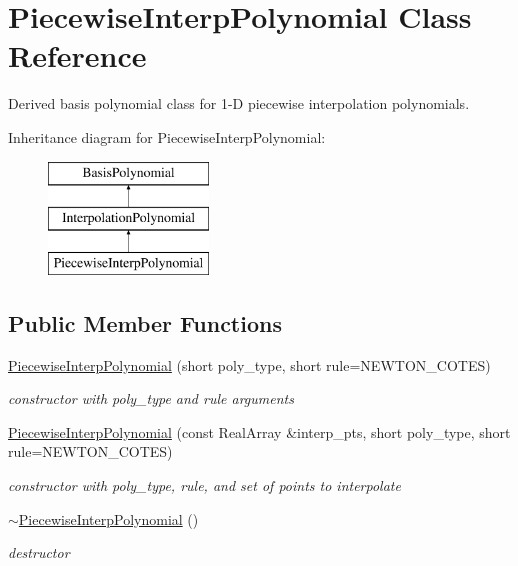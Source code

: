 \section{Piecewise\+Interp\+Polynomial Class Reference}
\label{classPecos_1_1PiecewiseInterpPolynomial}


Derived basis polynomial class for 1-\/D piecewise interpolation polynomials.  


Inheritance diagram for Piecewise\+Interp\+Polynomial\+:\begin{figure}[H]
\begin{center}
\leavevmode
\includegraphics[height=3.000000cm]{classPecos_1_1PiecewiseInterpPolynomial}
\end{center}
\end{figure}
\subsection*{Public Member Functions}
\begin{DoxyCompactItemize}
\item 
\hyperlink{classPecos_1_1PiecewiseInterpPolynomial_a8782271ac72317a451529f0577c097d4}{Piecewise\+Interp\+Polynomial} (short poly\+\_\+type, short rule=N\+E\+W\+T\+O\+N\+\_\+\+C\+O\+T\+ES)\label{classPecos_1_1PiecewiseInterpPolynomial_a8782271ac72317a451529f0577c097d4}

\begin{DoxyCompactList}\small\item\em constructor with poly\+\_\+type and rule arguments \end{DoxyCompactList}\item 
\hyperlink{classPecos_1_1PiecewiseInterpPolynomial_aba22147e7b8e49acdeafebe04b13fc43}{Piecewise\+Interp\+Polynomial} (const Real\+Array \&interp\+\_\+pts, short poly\+\_\+type, short rule=N\+E\+W\+T\+O\+N\+\_\+\+C\+O\+T\+ES)\label{classPecos_1_1PiecewiseInterpPolynomial_aba22147e7b8e49acdeafebe04b13fc43}

\begin{DoxyCompactList}\small\item\em constructor with poly\+\_\+type, rule, and set of points to interpolate \end{DoxyCompactList}\item 
\hyperlink{classPecos_1_1PiecewiseInterpPolynomial_aeeaccc5fd15abd34d002a4e5278bc20e}{$\sim$\+Piecewise\+Interp\+Polynomial} ()\label{classPecos_1_1PiecewiseInterpPolynomial_aeeaccc5fd15abd34d002a4e5278bc20e}

\begin{DoxyCompactList}\small\item\em destructor \end{DoxyCompactList}\end{DoxyCompactItemize}
